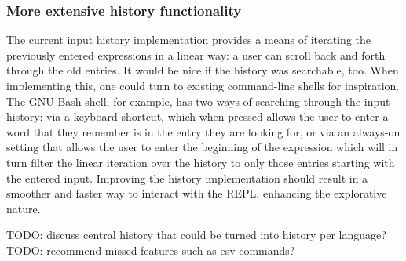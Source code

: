 \subsubsection{More extensive history functionality}

The current input history implementation provides a means of iterating the
previously entered expressions in a linear way: a user can scroll back and forth
through the old entries. It would be nice if the history was searchable, too.
When implementing this, one could turn to existing command-line shells for
inspiration. The GNU Bash shell, for example, has two ways of searching through
the input history: via a keyboard shortcut, which when pressed allows the user
to enter a word that they remember is in the entry they are looking for, or via
an always-on setting that allows the user to enter the beginning of the
expression which will in turn filter the linear iteration over the history to
only those entries starting with the entered input.
Improving the history implementation should result in a smoother and faster way
to interact with the REPL, enhancing the explorative nature.

TODO: discuss central history that could be turned into history per language?
TODO: recommend missed features such as esv commands?

